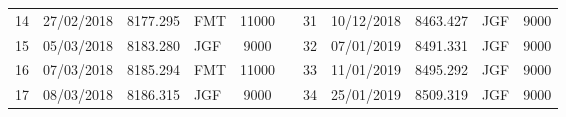 \begin{table}[htbp]
\begin{tabular}{|c|c|c|p{1.715em}|c|r|c|c|c|p{1.715em}|c|}
\cmidrule{1-5}\cmidrule{7-11}    14    & 27/02/2018 & 8177.295 & FMT   & 11000 &       & 31    & 10/12/2018 & 8463.427 & JGF   & 9000 \\
\cmidrule{1-5}\cmidrule{7-11}    15    & 05/03/2018 & 8183.280 & JGF   & 9000  &       & 32    & 07/01/2019 & 8491.331 & JGF   & 9000 \\
\cmidrule{1-5}\cmidrule{7-11}    16    & 07/03/2018 & 8185.294 & FMT   & 11000 &       & 33    & 11/01/2019 & 8495.292 & JGF   & 9000 \\
\cmidrule{1-5}\cmidrule{7-11}    17    & 08/03/2018 & 8186.315 & JGF   & 9000  &       & 34    & 25/01/2019 & 8509.319 & JGF   & 9000 \\
\cmidrule{1-5}\cmidrule{7-11}    \end{tabular}%
  \label{tab:addlabel}%
\end{table}%
